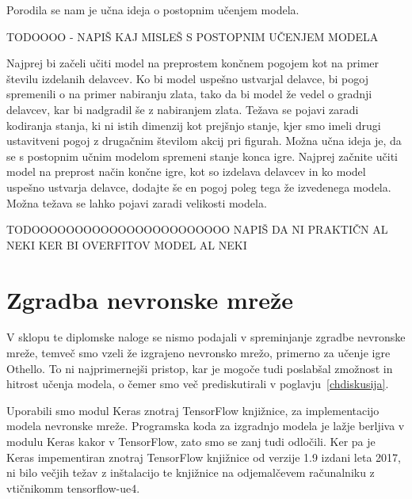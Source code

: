 \documentclass[a4paper, 12pt]{book}
\begin{document}
Porodila se nam je učna ideja o postopnim učenjem modela. 





TODOOOO - NAPIŠ KAJ MISLEŠ S POSTOPNIM UČENJEM MODELA


















Najprej bi začeli učiti model na preprostem končnem pogojem kot na primer številu izdelanih delavcev. 
Ko bi model uspešno ustvarjal delavce, bi pogoj spremenili o na primer nabiranju zlata, tako da bi model že vedel o gradnji delavcev, kar bi nadgradil še z nabiranjem zlata. 
Težava se pojavi zaradi kodiranja stanja, ki ni istih dimenzij kot prejšnjo stanje, kjer smo imeli drugi ustavitveni pogoj z drugačnim številom akcij pri figurah.
Možna učna ideja je, da se s postopnim učnim modelom spremeni stanje konca igre. 
Najprej začnite učiti model na preprost način končne igre, kot so izdelava delavcev in ko model uspešno ustvarja delavce, dodajte še en pogoj poleg tega že izvedenega modela.
Možna težava se lahko pojavi zaradi velikosti modela. 




TODOOOOOOOOOOOOOOOOOOOOOOO NAPIŠ DA NI PRAKTIČN AL NEKI KER BI OVERFITOV MODEL AL NEKI











\section{Zgradba nevronske mreže}

V sklopu te diplomske naloge se nismo podajali v spreminjanje zgradbe nevronske mreže, temveč smo vzeli že izgrajeno nevronsko mrežo, primerno za učenje igre Othello.
To ni najprimernejši pristop, kar je mogoče tudi poslabšal zmožnost in hitrost učenja modela, o čemer smo več prediskutirali v poglavju~\ref{chdiskusija}.

Uporabili smo modul Keras znotraj TensorFlow knjižnice, za implementacijo modela nevronske mreže.
Programska koda za izgradnjo modela je lažje berljiva v modulu Keras kakor v TensorFlow, zato smo se zanj tudi odločili.
Ker pa je Keras impementiran znotraj TensorFlow knjižnice od verzije 1.9 izdani leta 2017, ni bilo večjih težav z inštalacijo te knjižnice na odjemalčevem računalniku z vtičnikomm tensorflow-ue4.
\end{document}
